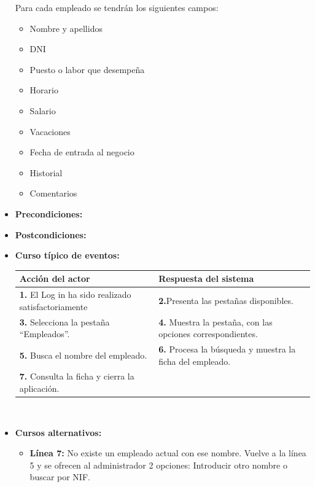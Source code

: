\documentclass[spanish,a4paper,11pt, twoside]{report}	%
\begin{document}
\begin{itemize}
Para cada empleado se tendrán los siguientes campos:
				\begin{itemize}
				\item 	 Nombre y apellidos
				\item 	 DNI
				\item 	 Puesto o labor que desempeña
				\item 	 Horario
				\item 	 Salario
				\item 	 Vacaciones
				\item 	 Fecha de entrada al negocio
				\item 	 Historial
				\item 	 Comentarios
				\end {itemize}
			\item \textbf{Precondiciones:} 
			\item \textbf{Postcondiciones:} 
			\item \textbf{Curso típico de eventos:} 	\\
				\begin{tabular}{|p{6cm}||p{6cm}|}
				\hline
				\textbf{Acción del actor} & \textbf{Respuesta del sistema} \\ \hline \hline
				\textbf{1.} El Log in ha sido realizado satisfactoriamente & \textbf{2.}Presenta las pestañas disponibles.\\ \hline 
				\textbf{3.} Selecciona la pestaña “Empleados”. & \textbf{4.} Muestra la pestaña, con las opciones correspondientes. \\ \hline
				\textbf{5.} Busca el nombre del empleado.	& \textbf{6.} Procesa la búsqueda y muestra la ficha del empleado. \\ \hline
				\textbf{7.} Consulta la ficha y cierra la aplicación.  & \textbf{} \\ \hline
			\end{tabular}
			\\
			\item \textbf{Cursos alternativos:} 
			\begin{itemize}
			\item  \textbf{Línea 7:} No existe un empleado actual con ese nombre. Vuelve a la línea 5 y se ofrecen al administrador 2 opciones: Introducir otro nombre o buscar por NIF. 
			\end {itemize}
		\end{itemize}%


	\hspace{-1.2 true cm}	
\end{document}

